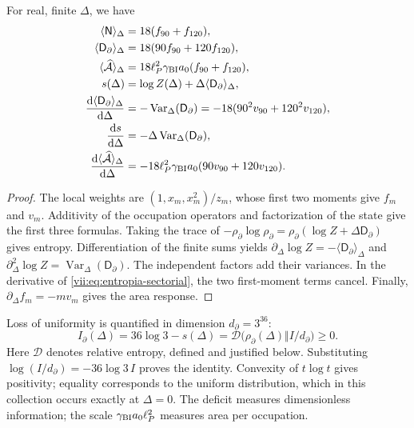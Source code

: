 \begin{proposition}
\label{vii:prop:respuesta-sectorial}
For real, finite \(\Delta\), we have
\begin{align}
 \langle\mathsf N\rangle_\Delta&=18(f_{90}+f_{120}),\\
 \langle\mathsf D_\partial\rangle_\Delta&=18(90f_{90}+120f_{120}),\\
 \langle\widehat{\mathcal A}\rangle_\Delta
 &=18\ell_P^2\gamma_{\rm BI}a_0(f_{90}+f_{120}),\\
 s(\Delta)&=\log Z(\Delta)+\Delta\langle\mathsf D_\partial\rangle_\Delta,
 \label{vii:eq:entropia-sectorial}\\
 \frac{\mathrm d\langle\mathsf D_\partial\rangle_\Delta}{\mathrm d\Delta}
 &=-\operatorname{Var}_\Delta(\mathsf D_\partial)
  =-18(90^2v_{90}+120^2v_{120}),\\
 \frac{\mathrm ds}{\mathrm d\Delta}
 &=-\Delta\operatorname{Var}_\Delta(\mathsf D_\partial),\\
 \frac{\mathrm d\langle\widehat{\mathcal A}\rangle_\Delta}{\mathrm d\Delta}
 &=-18\ell_P^2\gamma_{\rm BI}a_0(90v_{90}+120v_{120}).
 \label{vii:eq:respuestas-area-entropia}
\end{align}
\end{proposition}
\begin{proof}
The local weights are \((1,x_m,x_m^2)/z_m\), whose first two
moments give \(f_m\) and \(v_m\). Additivity of the occupation
operators and factorization of the state give the first three formulas.
Taking the trace of
\(-\rho_\partial\log\rho_\partial
=\rho_\partial(\log Z+\Delta\mathsf D_\partial)\)
gives entropy. Differentiation of the finite sums yields
\(\partial_\Delta\log Z=-\langle\mathsf D_\partial\rangle_\Delta\)
and \(\partial_\Delta^2\log Z
=\operatorname{Var}_\Delta(\mathsf D_\partial)\).
The independent factors add their variances. In the derivative of
\eqref{vii:eq:entropia-sectorial}, the two first-moment terms
cancel. Finally, \(\partial_\Delta f_m=-mv_m\)
gives the area response.
\end{proof}

Loss of uniformity is quantified in dimension \(d_\partial=3^{36}\):
\begin{equation}
 I_\partial(\Delta)
 =36\log3-s(\Delta)
 =\mathcal D\bigl(\rho_\partial(\Delta)\Vert I/d_\partial\bigr)\ge0.
 \label{vii:eq:deficit-informacional}
\end{equation}
Here \(\mathcal D\) denotes relative entropy, defined and justified
below. Substituting \(\log(I/d_\partial)=-36\log3\,I\) proves the
identity. Convexity of \(t\log t\) gives positivity; equality
corresponds to the uniform distribution, which in this collection occurs
exactly at \(\Delta=0\). The deficit measures dimensionless information;
the scale \(\gamma_{\rm BI}a_0\ell_P^2\) measures area per occupation.

